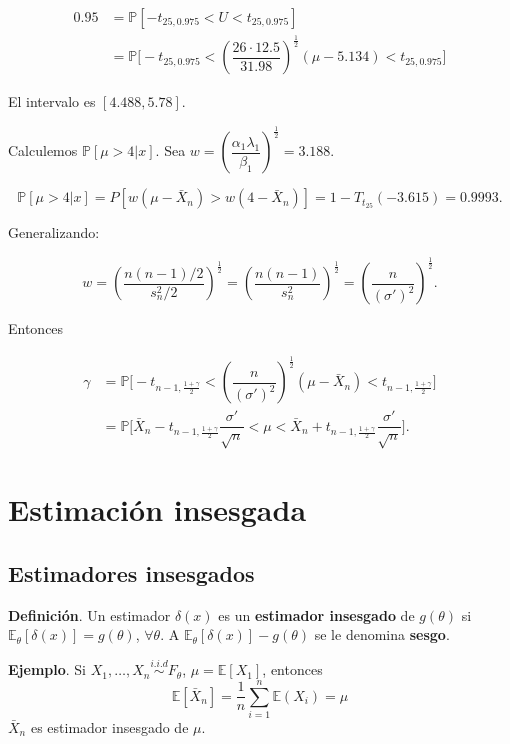 \documentclass[
  12pt,
]{book}
\begin{document}
\begin{align*}
 0.95 & = \mathbb P[-t_{25,0.975}<U<t_{25,0.975}]\\
 & = \mathbb P\bigg[-t_{25,0.975}<\left(\dfrac{26\cdot 12.5}{31.98}\right)^{\frac 12}(\mu-5.134) <t_{25,0.975}\bigg]
 \end{align*}

El intervalo es \([4.488,5.78]\).

Calculemos \(\mathbb P[\mu>4|x]\). Sea \(w =\left(\dfrac{\alpha_1\lambda_1}{\beta_1}\right)^{\frac 12} = 3.188\).

\[\mathbb P[\mu>4|x] = P[w(\mu-\bar X_n)>w(4-\bar X_n)]=1-T_{t_{25}}(-3.615) = 0.9993.\]

Generalizando:

\[w = \left(\dfrac{n(n-1)/2}{s_n^2/2}\right)^{\frac 12} = \left(\dfrac{n(n-1)}{s_n^2}\right)^{\frac 12} = \left(\dfrac{n}{(\sigma')^2}\right)^{\frac 12}.\]

Entonces

\begin{align*}
\gamma & = \mathbb P\bigg[-t_{n-1,\frac{1+\gamma}{2}} < \left(\dfrac{n}{(\sigma')^2}\right)^{\frac 12}(\mu-\bar X_n)<t_{n-1,\frac{1+\gamma}{2}}\bigg] \\
& =  \mathbb P\bigg[\bar X_n-t_{n-1,\frac{1+\gamma}{2}}  \dfrac{\sigma'}{\sqrt n} < \mu < \bar X_n+t_{n-1,\frac{1+\gamma}{2}}  \dfrac{\sigma'}{\sqrt n}  \bigg].
\end{align*}

\hypertarget{estimaciuxf3n-insesgada}{%
\chapter{Estimación insesgada}\label{estimaciuxf3n-insesgada}}

\hypertarget{estimadores-insesgados}{%
\section{Estimadores insesgados}\label{estimadores-insesgados}}

\textbf{Definición}. Un estimador \(\delta(x)\) es un \textbf{estimador insesgado} de \(g(\theta)\) si \(\mathbb E_{\theta}[\delta(x)] = g(\theta)\), \(\forall \theta\). A \(\mathbb E_{\theta}[\delta(x)] - g(\theta)\) se le denomina \textbf{sesgo}.

\textbf{Ejemplo}. Si \(X_1,\dots, X_n \overset{i.i.d}{\sim} F_\theta\), \(\mu = \mathbb E[X_1]\), entonces
\[\mathbb E[\bar X_n] = \dfrac 1n \sum_{i=1}^n\mathbb E(X_i) = \mu\]
\(\bar X_n\) es estimador insesgado de \(\mu\).
\end{document}
